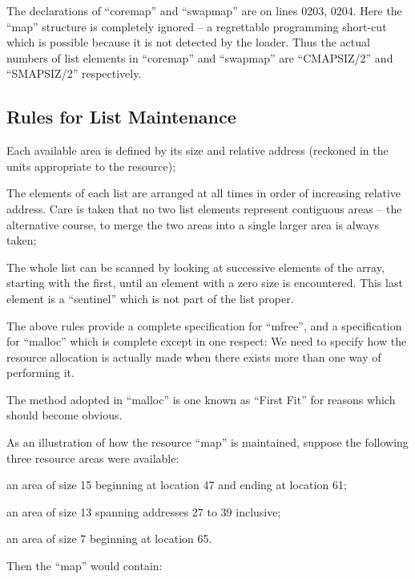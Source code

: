 The declarations of ``coremap'' and
``swapmap'' are on lines 0203, 0204.
Here the ``map'' structure is completely
ignored -- a regrettable programming
short-cut which is possible because it
is not detected by the loader. Thus the
actual numbers of list elements in
``coremap'' and ``swapmap'' are ``CMAPSIZ/2''
and ``SMAPSIZ/2'' respectively.


\subsection{Rules for List Maintenance}

\bd
\item[(a)] Each available area is defined
 by its size and relative address
 (reckoned in the units appropriate to the resource);

\item[(b)] The elements of each list are
 arranged at all times in order
 of increasing relative address.
 Care is taken that no two list
 elements represent contiguous
 areas -- the alternative course,
 to merge the two areas into a
 single larger area is always
 taken;
\item[(c)] The whole list can be scanned by
 looking at successive elements
 of the array, starting with the
 first, until an element with a
 zero size is encountered. This
 last element is a ``sentinel''
 which is not part of the list
 proper.
\ed

The above rules provide a complete
specification for ``mfree'', and a
specification for ``malloc'' which is
complete except in one respect:
We need to specify how the
resource allocation is actually
made when there exists more than
one way of performing it.

The method adopted in ``malloc'' is one
known as ``First Fit'' for reasons which
should become obvious.

As an illustration of how the resource
``map'' is maintained, suppose the following
three resource areas were available:

\bi
\item an area of size 15 beginning at
location 47 and ending at location
61;

\item an area of size 13 spanning
addresses 27 to 39 inclusive;

\item an area of size 7 beginning at
location 65.
\ei

\noindent Then the ``map'' would contain:

